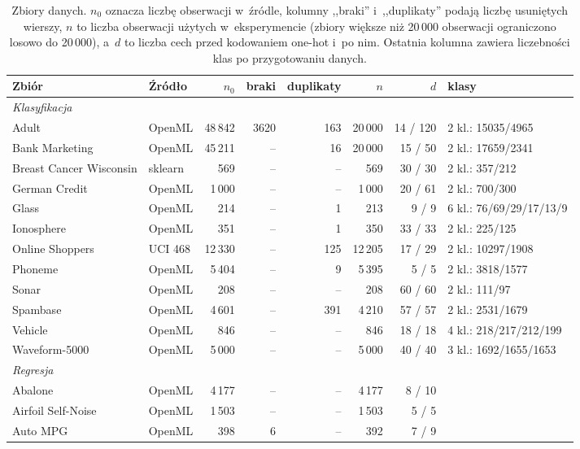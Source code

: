 \begin{table}[!htbp]
\centering\scriptsize\setlength{\tabcolsep}{4pt}
\caption{Zbiory danych. $n_0$ oznacza liczbę obserwacji w~źródle, kolumny ,,braki'' i~,,duplikaty'' podają liczbę usuniętych wierszy, $n$ to liczba obserwacji użytych w~eksperymencie (zbiory większe niż 20\,000 obserwacji ograniczono losowo do 20\,000), a~$d$ to liczba cech przed kodowaniem one-hot i~po nim. Ostatnia kolumna zawiera liczebności klas po przygotowaniu danych.}
\label{tab:zbiory}
\begin{tabular}{llrrrrrl}
\toprule
\textbf{Zbiór} & \textbf{Źródło} & $n_0$ & \textbf{braki} & \textbf{duplikaty} & $n$ & $d$ & \textbf{klasy} \\
\midrule
\multicolumn{8}{l}{\emph{Klasyfikacja}}\\
Adult & OpenML & 48\,842 & 3620 & 163 & 20\,000 & 14 / 120 & 2 kl.: 15035/4965\\
Bank Marketing & OpenML & 45\,211 & -- & 16 & 20\,000 & 15 / 50 & 2 kl.: 17659/2341\\
Breast Cancer Wisconsin & sklearn & 569 & -- & -- & 569 & 30 / 30 & 2 kl.: 357/212\\
German Credit & OpenML & 1\,000 & -- & -- & 1\,000 & 20 / 61 & 2 kl.: 700/300\\
Glass & OpenML & 214 & -- & 1 & 213 & 9 / 9 & 6 kl.: 76/69/29/17/13/9\\
Ionosphere & OpenML & 351 & -- & 1 & 350 & 33 / 33 & 2 kl.: 225/125\\
Online Shoppers & UCI 468 & 12\,330 & -- & 125 & 12\,205 & 17 / 29 & 2 kl.: 10297/1908\\
Phoneme & OpenML & 5\,404 & -- & 9 & 5\,395 & 5 / 5 & 2 kl.: 3818/1577\\
Sonar & OpenML & 208 & -- & -- & 208 & 60 / 60 & 2 kl.: 111/97\\
Spambase & OpenML & 4\,601 & -- & 391 & 4\,210 & 57 / 57 & 2 kl.: 2531/1679\\
Vehicle & OpenML & 846 & -- & -- & 846 & 18 / 18 & 4 kl.: 218/217/212/199\\
Waveform-5000 & OpenML & 5\,000 & -- & -- & 5\,000 & 40 / 40 & 3 kl.: 1692/1655/1653\\
\midrule
\multicolumn{8}{l}{\emph{Regresja}}\\
Abalone & OpenML & 4\,177 & -- & -- & 4\,177 & 8 / 10 & \\
Airfoil Self-Noise & OpenML & 1\,503 & -- & -- & 1\,503 & 5 / 5 & \\
Auto MPG & OpenML & 398 & 6 & -- & 392 & 7 / 9 & \\

\end{tabular}
\end{table}
